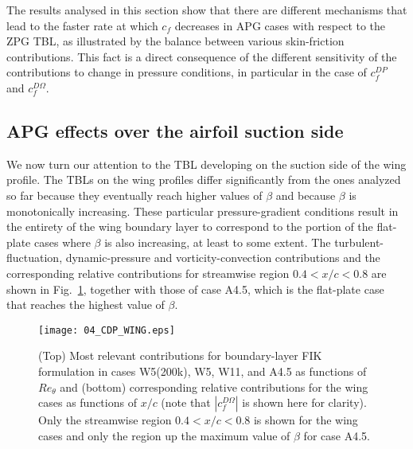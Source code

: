  
 The results analysed in this section show that there are different mechanisms that lead to the faster rate at which $c_f$ decreases in APG cases with respect to the ZPG TBL, as illustrated by the balance between various skin-friction contributions. This fact is a direct consequence of the different sensitivity of the contributions to change in pressure conditions, in particular in the case of $c^{DP}_f$ and $c^{D\Omega}_f$.

\subsection{APG effects over the airfoil suction side}
We now turn our attention to the TBL developing on the suction side of the wing profile. The TBLs on the wing profiles differ significantly from the ones analyzed so far because they eventually reach higher values of $\beta$ and because $\beta$ is monotonically increasing. These particular pressure-gradient conditions result in the entirety of the wing boundary layer to correspond to the portion of the flat-plate cases where $\beta$ is also increasing, at least to some extent. The turbulent-fluctuation, dynamic-pressure and vorticity-convection contributions and the corresponding relative contributions for streamwise region $0.4<x/c<0.8$ are shown in Fig.~\ref{fig:contributionsWing}, together with those of case A4.5, which is the flat-plate case that reaches the highest value of $\beta$. 

\begin{figure}
\centering
\texttt{[image: 04\_CDP\_WING.eps]}
\caption{\label{fig:contributionsWing} (Top) Most relevant contributions for boundary-layer FIK formulation in cases W5(200k), W5, W11, and A4.5 as functions of $Re_\theta$ and (bottom) corresponding relative contributions for the wing cases as functions of $x/c$ (note that $|c^{D\Omega}_f|$ is shown here for clarity). Only the streamwise region $0.4<x/c<0.8$ is shown for the wing cases and only the region up the maximum value of $\beta$ for case A4.5. }
\end{figure}


